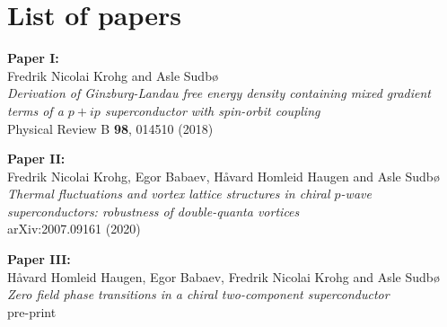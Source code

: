 \chapter*{List of papers}
%
\vspace{.3cm}

\noindent\textbf{Paper I:}\\
Fredrik Nicolai Krohg and Asle Sudb{\o}\\
\textit{Derivation of Ginzburg-Landau free energy density containing mixed gradient terms of a $p+ip$ superconductor with spin-orbit coupling}\\
Physical Review B \textbf{98}, 014510 (2018) \hspace{.5cm}\cite{Krohg18}
\vspace{1cm}

\noindent\textbf{Paper II:}\\
Fredrik Nicolai Krohg, Egor Babaev, Håvard Homleid Haugen and Asle Sudb{\o}\\
\textit{Thermal fluctuations and vortex lattice structures in chiral $p$-wave superconductors: robustness of double-quanta vortices}\\
arXiv:2007.09161 (2020) \hspace{.5cm}\cite{Krohg20}
\vspace{1cm}

\noindent\textbf{Paper III:}\\
Håvard Homleid Haugen, Egor Babaev, Fredrik Nicolai Krohg and Asle Sudb{\o}\\
\textit{Zero field phase transitions in a chiral two-component superconductor}\\
pre-print

